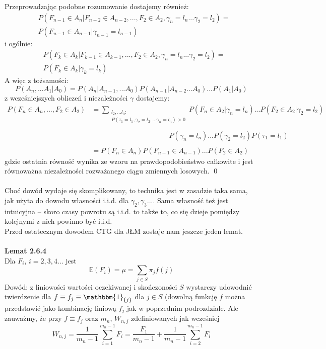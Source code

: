 \documentclass[a4paper]{article}
\begin{document}
Przeprowadzając podobne rozumowanie dostajemy również:
\begin{align*}
&P(F_{n-1} \in A_n|F_{n-2} \in A_{n-2},  ..., F_2 \in A_2, \gamma_n = l_n ... \gamma_2 = l_2) =\\ & P(F_{n-1} \in A_{n-1} | \gamma_{n-1} = l_{n-1})
\end{align*}
i ogólnie:
\begin{align*}
&P(F_{k} \in A_k|F_{k-1} \in A_{k-1},  ..., F_2 \in A_2, \gamma_n = l_n ... \gamma_2 = l_2) =\\ & P(F_{k} \in A_{k} | \gamma_{k} = l_{k})
\end{align*}
A więc z tożsamości:
$$P(A_n, ... A_1|A_0) = P(A_n|A_{n-1}, ...A_0)P(A_{n-1}|A_{n-2}...A_0)...P(A_1|A_0)$$
z wcześniejszych obliczeń i niezależności $\gamma$ dostajemy:
\begin{align*}
    P(F_n \in A_n, ..., F_2 \in A_2) &= \sum\limits_{\substack{l_2, ... l_n:\\P(\tau_1 = l_1, \gamma_2 = l_2, ... \gamma_n = l_n) > 0}} P(F_n \in A_2|\gamma_n = l_n) ... P(F_2 \in A_2|\gamma_2 = l_2)\\\\
    &\quad\quad\quad\quad\quad\quad\quad\quad\quad\quad\quad P(\gamma_n = l_n) ... P(\gamma_2 = l_2)P(\tau_1 = l_1)\\\\
    &= P(F_n \in A_n)P(F_{n-1} \in A_{n-1}) ... P(F_2 \in A_2)
\end{align*}
gdzie ostatnia równość wynika ze wzoru na prawdopodobieństwo całkowite i jest równoważna niezależności rozważanego ciągu zmiennych losowych. \qed
\\\\
Choć dowód wydaje się skomplikowany, to technika jest w zasadzie taka sama, jak użyta do dowodu własności i.i.d. dla $\gamma_2, \gamma_3 ...$. Sama własność też jest intuicyjna – skoro czasy powrotu są i.i.d. to także to, co się dzieje pomiędzy kolejnymi z nich powinno być i.i.d.\\
Przed ostatecznym dowodem CTG dla JŁM zostaje nam jeszcze jeden lemat.\\
\\
\textbf{Lemat 2.6.4}\\
Dla $F_i$, $i=2,3,4...$ jest
$$\mathbb{E}(F_i) = \mu = \sum\limits_{j \in S} \pi_j f(j)$$
Dowód: z liniowości wartości oczekiwanej i skończoności $S$ wystarczy udowodnić twierdzenie dla $f \equiv f_j \equiv \mathbbm{1}_{\{j\}}$ dla $j \in S$ (dowolną funkcję $f$ można przedstawić jako kombinację liniową $f_j$ jak w poprzednim podrozdziale. Ale zauważmy, że przy $f \equiv f_j$ oraz $m_n$, $W_{n, j}$ zdefiniowanych jak wcześniej $$W_{n, j} = \frac{1}{m_n -1}\sum\limits_{i = 1}^{m_n -1} F_i = \frac{F_1}{m_n - 1} + \frac{1}{m_n - 1} \sum\limits_{i = 2}^{m_n - 1} F_i$$
\end{document}
